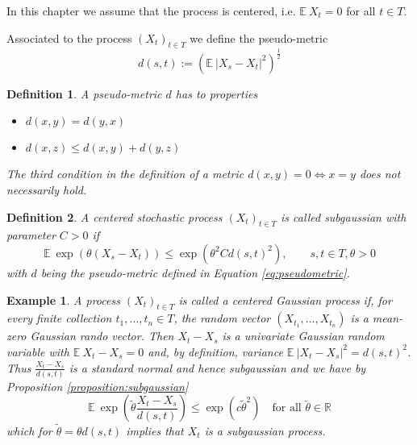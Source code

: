 \documentclass[10pt,a4paper]{article}
\theoremstyle{thmstyle}
\newtheorem{definition}{Definition}
\newtheorem{example}{Example}
\newcommand{\E}{\mathbb{E}~}
\begin{document}
In this chapter we assume that the process is centered, i.e. $\E X_{t} = 0$ for all $t \in T$.

Associated to the process $(X_{t})_{t \in T}$ we define the pseudo-metric
\begin{equation}
  d(s, t) := \left( \E |X_{s} - X_{t}|^{2} \right)^{\frac{1}{2}} \label{eq:pseudometric}
\end{equation}

\begin{definition}
  A \emph{pseudo-metric} $d$ has to properties
  \begin{itemize}
  \item $d(x, y) = d(y, x)$
  \item $d(x, z) \le d(x, y) + d(y, z)$
  \end{itemize}
  The third condition in the definition of a metric $d(x, y) = 0 \Leftrightarrow x = y$ does not necessarily hold.
\end{definition}

\begin{definition}
  A centered stochastic process $(X_{t})_{t \in T}$ is called \emph{subgaussian} with parameter $C > 0$ if
  \begin{equation*}
    \E \exp(\theta(X_{s} - X_{t})) \le \exp(\theta^{2} C d(s, t)^{2}), \qquad s, t \in T, \theta > 0
  \end{equation*}
  with $d$ being the pseudo-metric defined in Equation \eqref{eq:pseudometric}.
\end{definition}

\begin{example}
  A process $(X_{t})_{t \in T}$ is called a centered Gaussian process if, for every finite collection $t_{1}, \dots, t_{n} \in T$, the random vector $(X_{t_{1}}, \dots, X_{t_{n}})$ is a mean-zero Gaussian rando vector.
  Then $X_{t} - X_{s}$ is a univariate Gaussian random variable with $\E X_{t} - X_{s} = 0$ and, by definition, variance $\E |X_{t} - X_{s}|^{2} = d(s, t)^{2}$.
  Thus $\frac{X_{t} - X_{s}}{d(s, t)}$ is a standard normal and hence subgaussian and we have by Proposition \ref{proposition:subgaussian}
  \begin{equation*}
    \E \exp\left( \tilde{\theta} \frac{X_{t} - X_{s}}{d(s, t)} \right) \le \exp(c \tilde{\theta}^{2}) \quad \text{for all $\tilde{\theta} \in \mathbb{R}$}
  \end{equation*}
  which for $\tilde{\theta} = \theta d(s, t)$ implies that $X_{t}$ is a subgaussian process.
\end{example}
\end{document}
